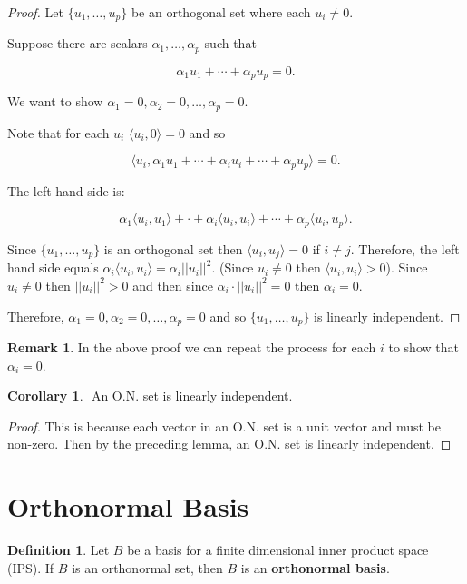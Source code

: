 \documentclass[12pt]{article}
\theoremstyle{definition}
\newtheorem*{definition}{Definition}
\newtheorem*{corollary}{Corollary}
\newtheorem*{remark}{Remark}
\begin{document}
\begin{proof}
Let $\{u_1, \dots, u_p\}$ be an orthogonal set where each $u_i \neq 0$.

Suppose there are scalars $\alpha_1, \dots, \alpha_p$ such that

\[ \alpha_1 u_1 + \cdots + \alpha_p u_p = 0. \]

We want to show $\alpha_1 = 0, \alpha_2 = 0, \ldots, \alpha_p = 0$.

\vspace{0.2cm}

Note that for each $u_i$ $\langle u_i, 0 \rangle = 0$ and so

\[ \langle u_i, \alpha_1 u_1 + \cdots + \alpha_i u_i + \cdots + \alpha_p u_p \rangle = 0. \]

The left hand side is:

\[ \alpha_1 \langle u_i , u_1 \rangle + \cdot + \alpha_i \langle u_i, u_i \rangle + \cdots + \alpha_p 
\langle u_i, u_p \rangle. \]

Since $\{ u_1, \ldots, u_p \}$ is an orthogonal set then $\langle u_i, u_j \rangle = 0$ if $i \neq j$.
Therefore, the left hand side equals $\alpha_i \langle u_i, u_i \rangle = \alpha_i ||u_i||^2$. (Since
$u_i \neq 0$ then $\langle u_i, u_i \rangle > 0$). Since $u_i \neq 0$ then $||u_i||^2 > 0$ and
then since $\alpha_i \cdot ||u_i||^2 = 0$ then $\alpha_i = 0$.

Therefore, $\alpha_1 = 0, \alpha_2 = 0, \ldots, \alpha_p = 0$ and so 
$\{u_1, \ldots, u_p \}$ is linearly independent.
\end{proof}

\begin{remark}
In the above proof we can repeat the process for each $i$ to show that $\alpha_i = 0$.
\end{remark}

\begin{corollary} $ $
An O.N. set is linearly independent.
\end{corollary}
\begin{proof}
This is because each vector in an O.N. set is a unit vector and must be non-zero. Then
by the preceding lemma, an O.N. set is linearly independent.
\end{proof}

\section{Orthonormal Basis}

\begin{definition}
Let $B$ be a basis for a finite dimensional inner product space (IPS). If $B$ is
an orthonormal set, then $B$ is an \textbf{orthonormal basis}.
\end{definition}
\end{document}
